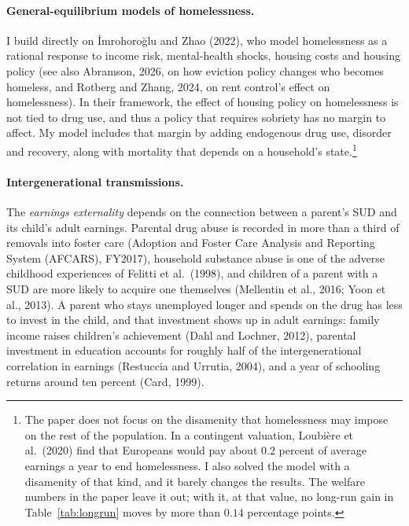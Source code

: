 \documentclass[10pt]{article}
\begin{document}
\paragraph{General-equilibrium models of homelessness.} I build directly on
\.{I}mrohoro\u{g}lu and Zhao (2022), who model homelessness as a rational
response to income risk, mental-health shocks, housing costs and housing policy (see also Abramson, 2026, on how eviction policy changes who becomes homeless, and Rotberg and Zhang, 2024, on rent control's effect on homelessness).
  In their framework, the effect of housing policy on homelessness is not tied to drug use, and thus a policy that requires sobriety has no margin to affect. My model includes that margin by adding endogenous drug use, disorder and recovery, along with mortality that depends on a household's state.\footnote{\label{fn:kappax}The paper does not focus on the disamenity that homelessness may impose on the rest of the population. In a contingent valuation, Loubi\`ere et al.\ (2020) find that Europeans would pay about $0.2$ percent of average earnings a year to end homelessness. I also solved the model with a disamenity of that kind, and it barely changes the results. The welfare numbers in the paper leave it out; with it, at that value, no long-run gain in Table~\ref{tab:longrun} moves by more than $0.14$ percentage points.}

\paragraph{Intergenerational transmissions.}  The \emph{earnings externality} depends on the connection between a parent's SUD and its child's adult earnings. Parental drug abuse is recorded in more than a third of removals into foster care (Adoption and Foster Care Analysis and Reporting System (AFCARS), FY2017), household substance abuse is one of the adverse childhood experiences of Felitti et al.\ (1998), and children of a parent with a SUD are more likely to acquire one themselves (Mellentin et al., 2016; Yoon et al., 2013). A parent who stays unemployed longer and spends on the drug has less to invest in the child, and that investment shows up in adult earnings: family income raises children's achievement (Dahl and Lochner, 2012), parental investment in education accounts for roughly half of the intergenerational correlation in earnings (Restuccia and Urrutia, 2004), and a year of schooling returns around ten percent (Card, 1999).
\end{document}
